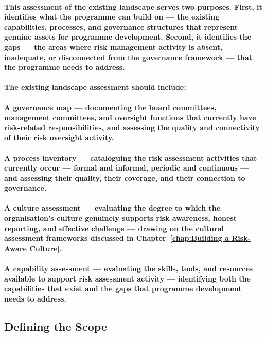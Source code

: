 \paragraph{This assessment of the existing landscape serves two purposes. First, it identifies what the programme can build on — the existing capabilities, processes, and governance structures that represent genuine assets for programme development. Second, it identifies the gaps — the areas where risk management activity is absent, inadequate, or disconnected from the governance framework — that the programme needs to address.}
\paragraph{The existing landscape assessment should include:}
\paragraph{\textbf{A governance map — documenting the board committees, management committees, and oversight functions that currently have risk-related responsibilities, and assessing the quality and connectivity of their risk oversight activity.}}
\paragraph{\textbf{A process inventory — cataloguing the risk assessment activities that currently occur — formal and informal, periodic and continuous — and assessing their quality, their coverage, and their connection to governance.}}
\paragraph{\textbf{A culture assessment} — evaluating the degree to which the organisation's culture genuinely supports risk awareness, honest reporting, and effective challenge — drawing on the cultural assessment frameworks discussed in Chapter~\ref{chap:Building a Risk-Aware Culture}.}
\paragraph{\textbf{A capability assessment} — evaluating the skills, tools, and resources available to support risk assessment activity — identifying both the capabilities that exist and the gaps that programme development needs to address.}

\subsection{Defining the Scope}
